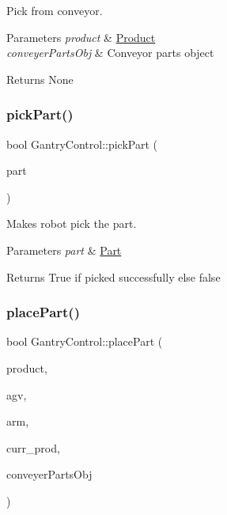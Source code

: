 Pick from conveyor. 


\begin{DoxyParams}{Parameters}
{\em product} & \hyperlink{structProduct}{Product} \\
\hline
{\em conveyer\+Parts\+Obj} & Conveyor parts object \\
\hline
\end{DoxyParams}
\begin{DoxyReturn}{Returns}
None 
\end{DoxyReturn}
\mbox{\label{classGantryControl_af9280bbee71d1ceca8aef3d616d48254}} 
\subsubsection{\texorpdfstring{pick\+Part()}{pickPart()}}
{\footnotesize\ttfamily bool Gantry\+Control\+::pick\+Part (\begin{DoxyParamCaption}\item[{\hyperlink{utils_8h_a67ee3a5b9091664130eca8efc8b97ab9}{part}}]{part }\end{DoxyParamCaption})}



Makes robot pick the part. 


\begin{DoxyParams}{Parameters}
{\em part} & \hyperlink{structPart}{Part} \\
\hline
\end{DoxyParams}
\begin{DoxyReturn}{Returns}
True if picked successfully else false 
\end{DoxyReturn}
\mbox{\label{classGantryControl_a17e2fb32a16a33c989903c4c1495c878}} 
\subsubsection{\texorpdfstring{place\+Part()}{placePart()}}
{\footnotesize\ttfamily bool Gantry\+Control\+::place\+Part (\begin{DoxyParamCaption}\item[{\hyperlink{utils_8h_a48a7207852c0455cce7e65703b12ec7e}{product} \&}]{product,  }\item[{std\+::string}]{agv,  }\item[{std\+::string}]{arm,  }\item[{struct \hyperlink{structall__Order}{all\+\_\+\+Order} $\ast$}]{curr\+\_\+prod,  }\item[{\hyperlink{classConveyerParts}{Conveyer\+Parts} \&}]{conveyer\+Parts\+Obj }\end{DoxyParamCaption})}



